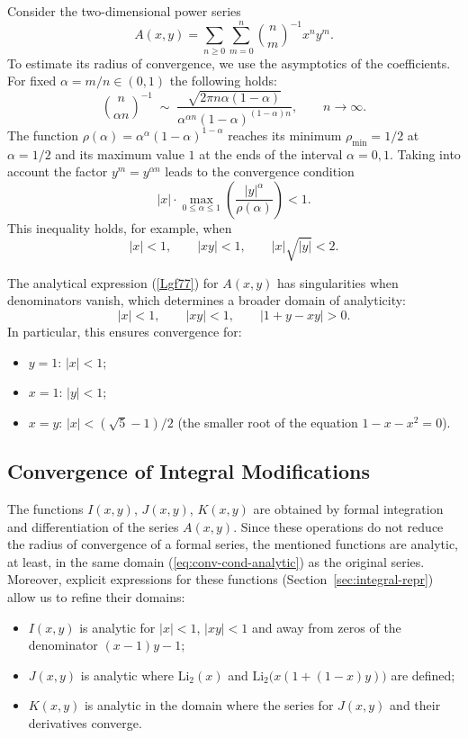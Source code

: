 \documentclass[12pt]{article}
\begin{document}
Consider the two-dimensional power series
\[
A(x,y) = \sum_{n\geq 0}\sum_{m=0}^n \binom{n}{m}^{-1} x^n y^m .
\]
To estimate its radius of convergence, we use the asymptotics of the coefficients.
For fixed $\alpha = m/n \in (0,1)$ the following holds:
\[
\binom{n}{\alpha n}^{-1} \;\sim\;
\frac{\sqrt{2\pi n\alpha(1-\alpha)}}{\alpha^{\alpha n}(1-\alpha)^{(1-\alpha)n}},
\qquad n\to\infty .
\]
The function $\rho(\alpha) = \alpha^{\alpha}(1-\alpha)^{1-\alpha}$ reaches its minimum
$\rho_{\min} = 1/2$ at $\alpha=1/2$ and its maximum value $1$ at the ends of the interval
$\alpha=0,1$. Taking into account the factor $y^m = y^{\alpha n}$ leads to the convergence condition
\[
|x|\cdot \max_{0\leq\alpha\leq 1} \left( \frac{|y|^\alpha}{\rho(\alpha)} \right) < 1 .
\]
This inequality holds, for example, when
\begin{equation}\label{eq:conv-cond-asympt}
|x| < 1, \qquad |xy| < 1, \qquad |x|\sqrt{|y|} < 2 .
\end{equation}

The analytical expression (\ref{Lgf77}) for $A(x,y)$ has singularities when
denominators vanish, which determines a broader domain of analyticity:
\begin{equation}\label{eq:conv-cond-analytic}
|x|<1, \qquad |xy|<1, \qquad |1+y-xy|>0 .
\end{equation}
In particular, this ensures convergence for:
\begin{itemize}
\item $y=1$: $|x|<1$;
\item $x=1$: $|y|<1$;
\item $x=y$: $|x|<(\sqrt{5}-1)/2$ (the smaller root of the equation $1-x-x^2=0$).
\end{itemize}

\subsection{Convergence of Integral Modifications}

The functions $I(x,y)$, $J(x,y)$, $K(x,y)$ are obtained by formal integration
and differentiation of the series $A(x,y)$. Since these operations do not reduce
the radius of convergence of a formal series, the mentioned functions are analytic, at least,
in the same domain (\ref{eq:conv-cond-analytic}) as the original series.
Moreover, explicit expressions for these functions (Section~\ref{sec:integral-repr})
allow us to refine their domains:
\begin{itemize}
\item $I(x,y)$ is analytic for $|x|<1$, $|xy|<1$ and away from zeros of the denominator $(x-1)y-1$;
\item $J(x,y)$ is analytic where $\mathrm{Li}_2(x)$ and
      $\mathrm{Li}_2\!\bigl(x(1+(1-x)y)\bigr)$ are defined;
\item $K(x,y)$ is analytic in the domain where the series for $J(x,y)$ and their derivatives converge.
\end{itemize}
\end{document}
